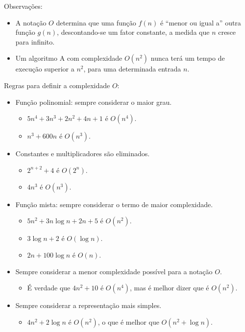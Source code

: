 
Observações:
\begin{itemize}
	\item A notação $O$ determina que uma função $f(n)$ é ``menor ou igual a'' outra função $g(n)$, descontando-se um fator constante, a medida que $n$ cresce para infinito.
	
	\item Um algoritmo A com complexidade $O(n^2)$ nunca terá um tempo de execução superior a $n^2$, para uma determinada entrada $n$.
\end{itemize}

Regras para definir a complexidade $O$:
\begin{itemize}
	\item Função polinomial: sempre considerar o maior grau.
	\begin{itemize}
		\item $5n^4 + 3n^3 + 2n^2 + 4n + 1$ é $O(n^4)$.
		\item $n^3 + 600n$ é $O(n^3)$.
	\end{itemize}
	
	\item Constantes e multiplicadores são eliminados.
	\begin{itemize}
		\item $2^{n + 2} + 4$ é $O(2^n)$.
		\item $4n^3$ é $O(n^3)$.
	\end{itemize}
	
	\item Função mista: sempre considerar o termo de maior complexidade.
	\begin{itemize}
		\item $5n^2 + 3n \log n + 2n + 5$ é $O(n^2)$.
		\item $3 \log n + 2$ é $O(\log n)$.
		\item $2n + 100 \log n$ é $O(n)$.
	\end{itemize}
	
	\item Sempre considerar a menor complexidade possível para a notação $O$.
	\begin{itemize}
		\item É verdade que $4n^2 + 10$ é $O(n^4)$, mas é melhor dizer que é $O(n^2)$.
	\end{itemize}
	
	\item Sempre considerar a representação mais simples.
	\begin{itemize}
		\item $4n^2 + 2 \log n$ é $O(n^2)$, o que é melhor que $O(n^2 + \log n)$.
	\end{itemize}
\end{itemize}

